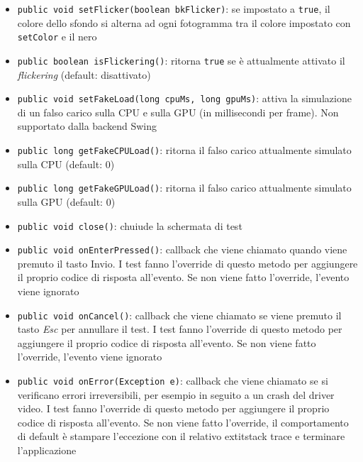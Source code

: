 \begin{itemize}
	\item \texttt{public void setFlicker(boolean bkFlicker)}: se impostato a \texttt{true}, il colore dello sfondo si alterna ad ogni fotogramma tra il colore impostato con \texttt{setColor} e il nero
	\item \texttt{public boolean isFlickering()}: ritorna \texttt{true} se è attualmente attivato il \textit{flickering} (default: disattivato)
	\item \texttt{public void setFakeLoad(long cpuMs, long gpuMs)}: attiva la simulazione di un falso carico sulla CPU e sulla GPU (in millisecondi per frame). Non supportato dalla backend Swing
	\item \texttt{public long getFakeCPULoad()}: ritorna il falso carico attualmente simulato sulla CPU (default: 0)
	\item \texttt{public long getFakeGPULoad()}: ritorna il falso carico attualmente simulato sulla GPU (default: 0)
	\item \texttt{public void close()}: chuiude la schermata di test
	\item \texttt{public void onEnterPressed()}: callback che viene chiamato quando viene premuto il tasto Invio. I test fanno l'override di questo metodo per aggiungere il proprio codice di risposta all'evento. Se non viene fatto l'override, l'evento viene ignorato
	\item \texttt{public void onCancel()}: callback che viene chiamato se viene premuto il tasto \textit{Esc} per annullare il test. I test fanno l'override di questo metodo per aggiungere il proprio codice di risposta all'evento. Se non viene fatto l'override, l'evento viene ignorato
	\item \texttt{public void onError(Exception e)}: callback che viene chiamato se si verificano errori irreversibili, per esempio in seguito a un crash del driver video. I test fanno l'override di questo metodo per aggiungere il proprio codice di risposta all'evento. Se non viene fatto l'override, il comportamento di default è stampare l'eccezione con il relativo 	extit{stack trace} e terminare l'applicazione
\end{itemize}

